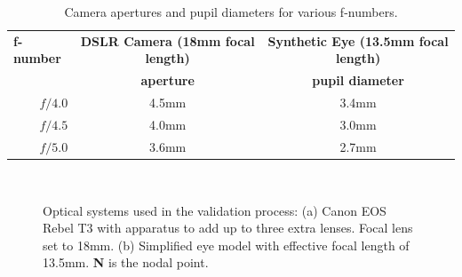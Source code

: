 
\begin{table}[h]
	\centering
	\caption{Camera apertures and pupil diameters for various f-numbers.}
	\label{table:pupildiameter}
	\begin{tabular}{rcc}
		\multicolumn{1}{l}{\bf f-number} & {\bf DSLR Camera (18mm focal length)} & {\bf Synthetic Eye (13.5mm focal length)} \\
		{\bf }               & {\bf aperture}     & {\bf pupil diameter}     \\
		{\bf $f/4.0$}         & 4.5mm                    & 3.4mm                        \\
		{\bf $f/4.5$}         & 4.0mm                    & 3.0mm                        \\
		{\bf $f/5.0$}         & 3.6mm                    & 2.7mm                        
	\end{tabular}
\end{table}

\begin{figure}[h]
	\centering
	
	~
	
	\caption[Optical systems used in the validation process]{Optical systems used in the validation process: (a) Canon EOS Rebel T3 with apparatus to add up to three extra lenses. Focal lens set to 18mm. (b) Simplified eye model with effective focal length of 13.5mm. {\bf N} is the nodal point.}
	\label{fig:camera}
\end{figure}